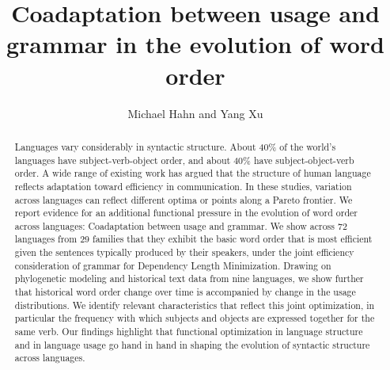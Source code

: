 \documentclass[11pt,a4paper]{article}
\title{Coadaptation between usage and grammar in the evolution of word order}
\author{Michael Hahn and Yang Xu}
\begin{document}
\maketitle


\begin{abstract}
Languages vary considerably in syntactic structure.
About 40\% of the world's languages have subject-verb-object order, and about 40\% have subject-object-verb order.
A wide range of existing work has argued that the structure of human language reflects adaptation toward efficiency in communication.
In these studies, variation across languages can reflect different optima or points along a Pareto frontier.
We report evidence for an additional functional pressure in the evolution of word order across languages:
Coadaptation between usage and grammar.
We show across 72 languages from 29 families that they exhibit the basic word order that is most efficient given the sentences typically produced by their speakers, under the joint efficiency consideration of grammar for Dependency Length Minimization.
Drawing on phylogenetic modeling and historical text data from nine languages, we show further that historical word order change over time is accompanied by change in the usage distributions.
We identify relevant characteristics that reflect this joint optimization, in particular the frequency with which subjects and objects are expressed together for the same verb.
Our findings highlight that functional optimization in language structure and in language usage go hand in hand in shaping the evolution of syntactic structure across languages.
\end{abstract}



\end{document}
